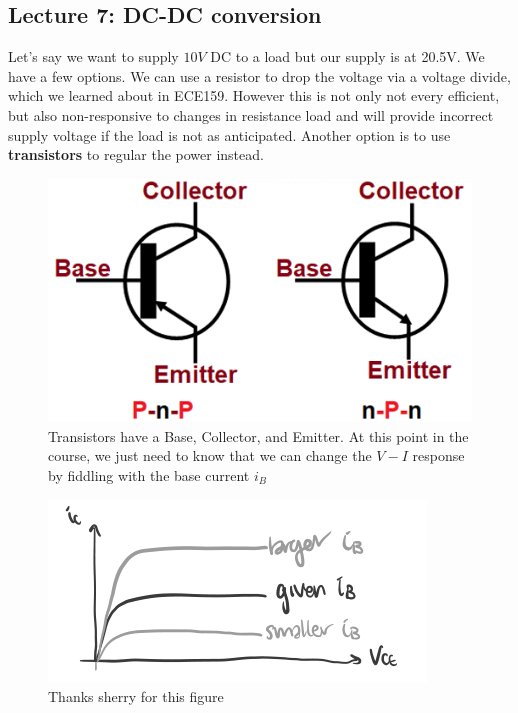 \documentclass[../notes.tex]{subfiles}
\begin{document}
\subsection{Lecture 7: DC-DC conversion}

Let's say we want to supply $ 10V $  DC to a load but our supply is at 20.5V.
We have a few options. We can use a resistor to drop the voltage via a voltage divide, which we learned about in ECE159.
However this is not only not every efficient, but also non-responsive to changes in resistance load and will provide incorrect supply voltage if the load is not as anticipated.
Another option is to use \textbf{transistors} to regular the power instead.

\begin{figure}[H]
	\centering
	\includegraphics[width=0.8\linewidth]{img/image_2022-09-23-02-42-21.png}
	\caption{Transistors have a Base, Collector, and Emitter. At this point in the course, we just need to know that we can change the $ V-I $ response by fiddling with the base current $ i_B $   }
\end{figure}

\begin{figure}[H]
	\centering
	\includegraphics[width=0.8\linewidth]{img/image_2022-09-23-02-42-56.png}
	\caption{Thanks sherry for this figure}
\end{figure}
\end{document}
